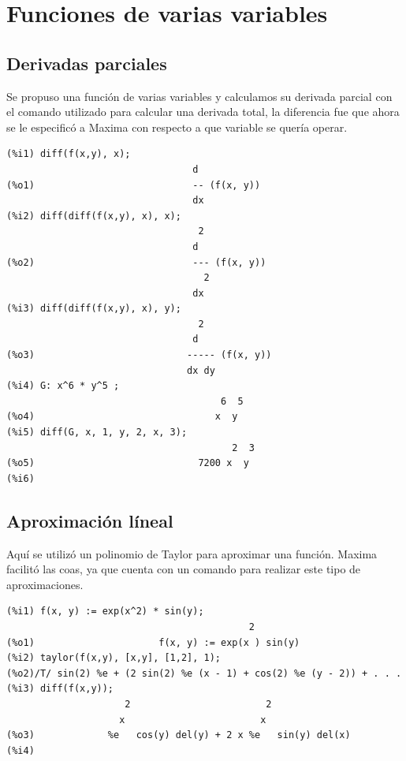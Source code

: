 \documentclass[12pt,letterpaper]{article}
\begin{document}
\section{Funciones de varias variables}

\subsection{Derivadas parciales}
Se propuso una función  de varias variables y calculamos su derivada parcial con el comando utilizado para calcular una derivada total, la diferencia fue que ahora se le especificó a Maxima con respecto a que variable se quería operar.

\begin{verbatim}
(%i1) diff(f(x,y), x);
                                 d
(%o1)                            -- (f(x, y))
                                 dx
(%i2) diff(diff(f(x,y), x), x);
                                  2
                                 d
(%o2)                            --- (f(x, y))
                                   2
                                 dx
(%i3) diff(diff(f(x,y), x), y);
                                  2
                                 d
(%o3)                           ----- (f(x, y))
                                dx dy
(%i4) G: x^6 * y^5 ;
                                      6  5
(%o4)                                x  y
(%i5) diff(G, x, 1, y, 2, x, 3);
                                        2  3
(%o5)                             7200 x  y
(%i6) 
\end{verbatim}

\subsection{Aproximación líneal}
Aquí se utilizó un polinomio de Taylor para aproximar una función. Maxima facilitó las coas, ya que cuenta con un comando para realizar este tipo de aproximaciones.

\begin{verbatim}
(%i1) f(x, y) := exp(x^2) * sin(y);
                                           2
(%o1)                      f(x, y) := exp(x ) sin(y)
(%i2) taylor(f(x,y), [x,y], [1,2], 1);
(%o2)/T/ sin(2) %e + (2 sin(2) %e (x - 1) + cos(2) %e (y - 2)) + . . .
(%i3) diff(f(x,y));
                     2                        2
                    x                        x
(%o3)             %e   cos(y) del(y) + 2 x %e   sin(y) del(x)
(%i4) 
\end{verbatim}
\end{document}
